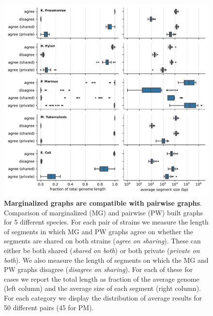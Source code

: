 \documentclass[aps,rmp,reprint,superscriptaddress,notitlepage,10pt,onecolumn]{revtex4-1}
\begin{document}
\begin{figure}[htb]
    \includegraphics[width=.9\textwidth]{figs_suppl/proj_fig.pdf}
    \caption{{\bf Marginalized graphs are compatible with pairwise graphs}. Comparison of marginalized (MG) and pairwise (PW) built graphs for 5 different species. For each pair of strains we measure the length of segments in which MG and PW graphs agree on whether the segments are shared on both strains (\textit{agree on sharing}). These can either be both shared (\textit{shared on both}) or both private (\textit{private on both}). We also measure the length of segments on which the MG and PW graphs disagree (\textit{disagree on sharing}). For each of these for cases we report the total length as fraction of the average genome (left column) and the average size of each segment (right column). For each category we display the distribution of average results for 50 different pairs (45 for PM).
    }
    \label{fig:marginalize-suppl}
\end{figure}


\end{document}
